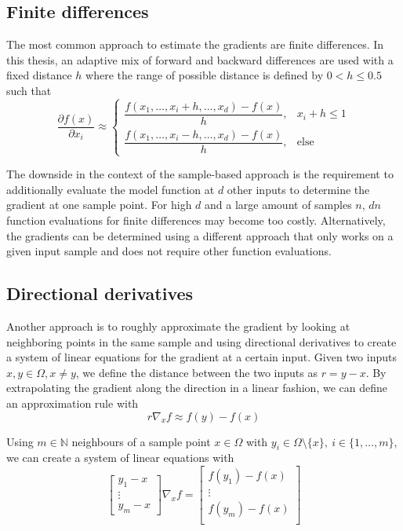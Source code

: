 \documentclass[
  a4paper,  %
  twoside,  %
  bibliography=totoc,
  headsepline,
  cleardoublepage=empty,
  parskip=half,
  draft=false
]{scrbook}
\begin{document}
\subsection{Finite differences}

The most common approach to estimate the gradients are finite differences.
In this thesis, an adaptive mix of forward and backward differences are used with a fixed distance $h$ where the range of possible distance is defined by $0 < h \leq 0.5$ such that
\begin{equation}
\frac{\partial f(x)}{\partial x_i} \approx
\begin{cases}
    \dfrac{f(x_1, \dots, x_i + h, \dots, x_d) - f(x)}{h}, & x_i + h \leq 1 \\[1.5em]
    \dfrac{f(x_1, \dots, x_i - h, \dots, x_d) - f(x)}{h}, & \text{else}
\end{cases}
\end{equation}

The downside in the context of the sample-based approach is the requirement to additionally evaluate the model function at $d$ other inputs to determine the gradient at one sample point.
For high $d$ and a large amount of samples $n$, $dn$ function evaluations for finite differences may become too costly.
Alternatively, the gradients can be determined using a different approach that only works on a given input sample and does not require other function evaluations.

\subsection{Directional derivatives}

Another approach is to roughly approximate the gradient by looking at neighboring points in the same sample and using directional derivatives to create a system of linear equations for the gradient at a certain input.
Given two inputs $x, y \in \Omega, x \neq y$, we define the distance between the two inputs as $r=y-x$.
By extrapolating the gradient along the direction in a linear fashion, we can define an approximation rule with
\begin{equation}
r \nabla_x f \approx f(y) - f(x)
\end{equation}

Using $m \in \mathds{N}$ neighbours of a sample point $x \in \Omega$ with $y_i \in \Omega \setminus \{x\}, ~ i \in \{1, \dots, m\}$, we can create a system of linear equations with
\begin{equation}
\begin{bmatrix}
    y_1 - x\\
    \vdots \\
    y_m - x
  \end{bmatrix}  \nabla_x f =\begin{bmatrix}
    f(y_1) - f(x) \\ \vdots \\  f(y_m) - f(x)
    \\
  \end{bmatrix}
  \label{dd_sle}
\end{equation}
\end{document}
